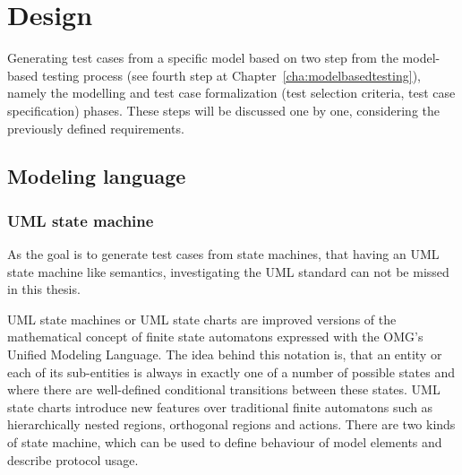 \chapter{Design}
\label{cha:design}

Generating test cases from a specific model based on two step from the model-based testing process (see fourth step at Chapter~\ref{cha:modelbasedtesting}), namely the modelling and test case formalization (test selection criteria, test case specification) phases. These steps will be discussed one by one, considering the previously defined requirements. 

\section{Modeling language}
\label{sec:modelinglanguage}


\subsection{UML state machine}
\label{sub:umlstatemachine}

As the goal is to generate test cases from state machines, that having an UML state machine like semantics, investigating the UML standard \cite{omguml} can not be missed in this thesis.

UML state machines or UML state charts are improved versions of the mathematical concept of finite state automatons expressed with the OMG's Unified Modeling Language. The idea behind this notation is, that an entity or each of its sub-entities is always in exactly one of a number of possible states and where there are well-defined conditional transitions between these states. UML state charts introduce new features over traditional finite automatons such as hierarchically nested regions, orthogonal regions and actions. There are two kinds of state machine, which can be used to define behaviour of model elements and describe protocol usage.

